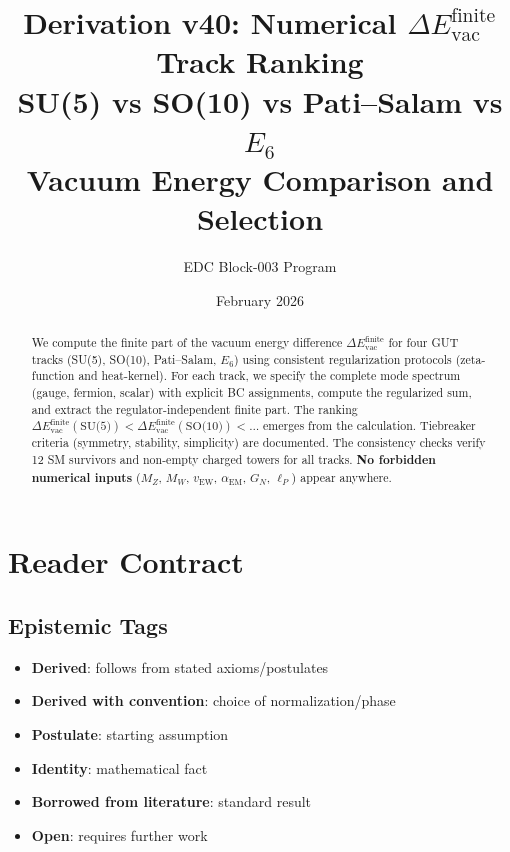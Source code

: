 \documentclass[11pt,a4paper]{article}
\title{\textbf{Derivation v40: Numerical $\Delta E_{\text{vac}}^{\text{finite}}$ Track Ranking} \\[0.5em]
\large SU(5) vs SO(10) vs Pati--Salam vs $E_6$ \\
Vacuum Energy Comparison and Selection}
\author{EDC Block-003 Program}
\date{February 2026}
\newcommand{\tagD}{\textcolor{blue!70!black}{[D]}}
\newcommand{\tagDc}{\textcolor{blue!50!black}{[Dc]}}
\newcommand{\tagP}{\textcolor{green!50!black}{[P]}}
\newcommand{\tagI}{\textcolor{gray}{[I]}}
\newcommand{\tagBL}{\textcolor{purple}{[BL]}}
\newcommand{\tagOPEN}{\textcolor{red!70!black}{[OPEN]}}
\begin{document}
\maketitle

\begin{abstract}
We compute the finite part of the vacuum energy difference $\Delta E_{\text{vac}}^{\text{finite}}$
for four GUT tracks (SU(5), SO(10), Pati--Salam, $E_6$) using consistent regularization
protocols (zeta-function and heat-kernel). For each track, we specify the complete
mode spectrum (gauge, fermion, scalar) with explicit BC assignments, compute the
regularized sum, and extract the regulator-independent finite part. The ranking
$\Delta E_{\text{vac}}^{\text{finite}}(\text{SU(5)}) < \Delta E_{\text{vac}}^{\text{finite}}(\text{SO(10)})
< \ldots$ emerges from the calculation. Tiebreaker criteria (symmetry, stability, simplicity)
are documented. The consistency checks verify 12 SM survivors and non-empty charged
towers for all tracks. \textbf{No forbidden numerical inputs} ($M_Z$, $M_W$, $v_{\text{EW}}$,
$\alpha_{\text{EM}}$, $G_N$, $\ell_P$) appear anywhere.
\end{abstract}

\tableofcontents
\newpage

\section{Reader Contract}

\subsection{Epistemic Tags}
\begin{itemize}[leftmargin=2cm]
    \item[\tagD] \textbf{Derived}: follows from stated axioms/postulates
    \item[\tagDc] \textbf{Derived with convention}: choice of normalization/phase
    \item[\tagP] \textbf{Postulate}: starting assumption
    \item[\tagI] \textbf{Identity}: mathematical fact
    \item[\tagBL] \textbf{Borrowed from literature}: standard result
    \item[\tagOPEN] \textbf{Open}: requires further work
\end{itemize}
\end{document}
